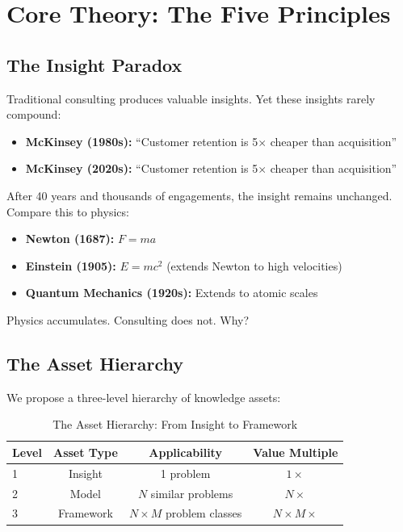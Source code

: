 \section{Core Theory: The Five Principles}
\label{sec:fm-theory}

\subsection{The Insight Paradox}

Traditional consulting produces valuable insights. Yet these insights rarely compound:

\begin{itemize}
    \item \textbf{McKinsey (1980s):} ``Customer retention is 5$\times$ cheaper than acquisition''
    \item \textbf{McKinsey (2020s):} ``Customer retention is 5$\times$ cheaper than acquisition''
\end{itemize}

After 40 years and thousands of engagements, the insight remains unchanged. Compare this to physics:

\begin{itemize}
    \item \textbf{Newton (1687):} $F = ma$
    \item \textbf{Einstein (1905):} $E = mc^2$ (extends Newton to high velocities)
    \item \textbf{Quantum Mechanics (1920s):} Extends to atomic scales
\end{itemize}

Physics accumulates. Consulting does not. Why?

\subsection{The Asset Hierarchy}

We propose a three-level hierarchy of knowledge assets:

\begin{table}[htbp]
\centering
\caption{The Asset Hierarchy: From Insight to Framework}
\label{tab:fm-asset-hierarchy}
\renewcommand{\arraystretch}{1.5}
\begin{tabular}{@{}lccc@{}}
\toprule
\textbf{Level} & \textbf{Asset Type} & \textbf{Applicability} & \textbf{Value Multiple} \\
\midrule
1 & Insight & 1 problem & $1 \times$ \\
2 & Model & $N$ similar problems & $N \times$ \\
3 & Framework & $N \times M$ problem classes & $N \times M \times$ \\
\bottomrule
\end{tabular}
\end{table}

